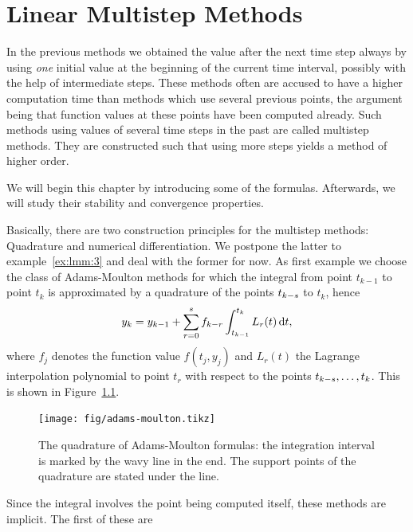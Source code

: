 \chapter{Linear Multistep Methods}


\begin{intro}
  In the previous methods we obtained the value after the next time
  step always by using \emph{one} initial value at the beginning of
  the current time interval, possibly with the
  help of intermediate steps. These methods often are accused to have
  a higher computation time than methods which use several previous
  points, the argument being that function values at these points have
  been computed already. Such methods using values of several time steps in
  the past are called multistep methods. They are constructed such
  that using more steps yields a method of higher order.

  We will begin this chapter by introducing some of the
  formulas. Afterwards, we will study their stability and convergence
  properties.
\end{intro}

\begin{example}
  \label{ex:lmm:2}  
   Basically, there are two construction
  principles for the multistep methods: Quadrature and numerical
  differentiation.  We postpone the latter to example~\ref{ex:lmm:3}
  and deal with the former for now.  As first example we choose the
  class of Adams-Moulton methods for which the integral from point
  $t_{k-1}$ to point $t_{k}$ is approximated by a quadrature of the
  points $t_{k-s}$ to $t_k$, hence
  \begin{gather}
    \label{eq:lmm:16}
    y_k = y_{k-1} + \sum_{r=0}^s f_{k-r} \int_{t_{k-1}}^{t_k}
    L_r(t) \,\mathrm{d} t,
  \end{gather}
  where $f_j$ denotes the function value $f(t_j, y_j)$ and $L_r(t)$
  the Lagrange interpolation polynomial to point $t_r$ with respect to
  the points $t_{k-s},\dots,t_k$.  This is shown in
  Figure~\ref{fig:lmm:adams-moulton}.
  \begin{figure}[tbp]
    \begin{center}
      \texttt{[image: fig/adams-moulton.tikz]}
    \end{center}
    \caption{The quadrature of Adams-Moulton formulas: the
      integration interval is marked by the wavy line in the end. The support 
			points of the quadrature are stated under the line.}
    \label{fig:lmm:adams-moulton}
  \end{figure}
  Since the integral involves the point being computed itself, these
  methods are implicit. The first of these are
    
\end{example}

